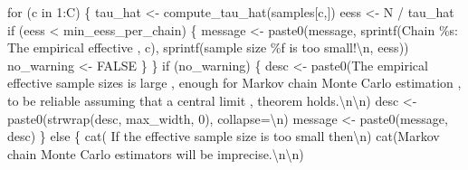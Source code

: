 \documentclass[
  letterpaper,
  DIV=11,
  numbers=noendperiod]{scrartcl}
\newenvironment{Shaded}{\begin{snugshade}}{\end{snugshade}}
\newcommand{\AttributeTok}[1]{\textcolor[rgb]{0.40,0.45,0.13}{#1}}
\newcommand{\ConstantTok}[1]{\textcolor[rgb]{0.56,0.35,0.01}{#1}}
\newcommand{\ControlFlowTok}[1]{\textcolor[rgb]{0.00,0.23,0.31}{#1}}
\newcommand{\DecValTok}[1]{\textcolor[rgb]{0.68,0.00,0.00}{#1}}
\newcommand{\FunctionTok}[1]{\textcolor[rgb]{0.28,0.35,0.67}{#1}}
\newcommand{\NormalTok}[1]{\textcolor[rgb]{0.00,0.23,0.31}{#1}}
\newcommand{\OtherTok}[1]{\textcolor[rgb]{0.00,0.23,0.31}{#1}}
\newcommand{\SpecialCharTok}[1]{\textcolor[rgb]{0.37,0.37,0.37}{#1}}
\newcommand{\StringTok}[1]{\textcolor[rgb]{0.13,0.47,0.30}{#1}}
\begin{document}
\begin{Shaded}
\begin{Highlighting}[]
  \ControlFlowTok{for}\NormalTok{ (c }\ControlFlowTok{in} \DecValTok{1}\SpecialCharTok{:}\NormalTok{C) \{}
\NormalTok{    tau\_hat }\OtherTok{\textless{}{-}} \FunctionTok{compute\_tau\_hat}\NormalTok{(samples[c,])}
\NormalTok{    eess }\OtherTok{\textless{}{-}}\NormalTok{ N }\SpecialCharTok{/}\NormalTok{ tau\_hat}
    \ControlFlowTok{if}\NormalTok{ (eess }\SpecialCharTok{\textless{}}\NormalTok{ min\_eess\_per\_chain) \{}
\NormalTok{      message }\OtherTok{\textless{}{-}} \FunctionTok{paste0}\NormalTok{(message,}
                        \FunctionTok{sprintf}\NormalTok{(}\StringTok{\textquotesingle{}Chain \%s: The empirical effective \textquotesingle{}}\NormalTok{, c),}
                        \FunctionTok{sprintf}\NormalTok{(}\StringTok{\textquotesingle{}sample size \%f is too small!}\SpecialCharTok{\textbackslash{}n}\StringTok{\textquotesingle{}}\NormalTok{, eess))}
\NormalTok{      no\_warning }\OtherTok{\textless{}{-}} \ConstantTok{FALSE}
\NormalTok{    \}}
\NormalTok{  \}}
  \ControlFlowTok{if}\NormalTok{ (no\_warning) \{}
\NormalTok{    desc }\OtherTok{\textless{}{-}} \FunctionTok{paste0}\NormalTok{(}\StringTok{\textquotesingle{}The empirical effective sample sizes is large \textquotesingle{}}\NormalTok{,}
                   \StringTok{\textquotesingle{}enough for Markov chain Monte Carlo estimation \textquotesingle{}}\NormalTok{,}
                   \StringTok{\textquotesingle{}to be reliable assuming that a central limit \textquotesingle{}}\NormalTok{,}
                   \StringTok{\textquotesingle{}theorem holds.}\SpecialCharTok{\textbackslash{}n\textbackslash{}n}\StringTok{\textquotesingle{}}\NormalTok{)}
\NormalTok{    desc }\OtherTok{\textless{}{-}} \FunctionTok{paste0}\NormalTok{(}\FunctionTok{strwrap}\NormalTok{(desc, max\_width, }\DecValTok{0}\NormalTok{), }\AttributeTok{collapse=}\StringTok{\textquotesingle{}}\SpecialCharTok{\textbackslash{}n}\StringTok{\textquotesingle{}}\NormalTok{)}
\NormalTok{    message }\OtherTok{\textless{}{-}} \FunctionTok{paste0}\NormalTok{(message, desc)}
\NormalTok{  \} }\ControlFlowTok{else}\NormalTok{ \{}
    \FunctionTok{cat}\NormalTok{(}\StringTok{\textquotesingle{}  If the effective sample size is too small then}\SpecialCharTok{\textbackslash{}n}\StringTok{\textquotesingle{}}\NormalTok{)}
    \FunctionTok{cat}\NormalTok{(}\StringTok{\textquotesingle{}Markov chain Monte Carlo estimators will be imprecise.}\SpecialCharTok{\textbackslash{}n\textbackslash{}n}\StringTok{\textquotesingle{}}\NormalTok{)}
    

\end{Highlighting}
\end{Shaded}
\end{document}

